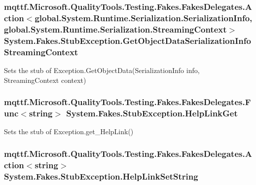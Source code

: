 \hypertarget{class_system_1_1_fakes_1_1_stub_exception_a9a4c74afd3db761e13b159f7393c77fe}{
\subsubsection[{Get\-Object\-Data\-Serialization\-Info\-Streaming\-Context}]{\setlength{\rightskip}{0pt plus 5cm}mqttf.\-Microsoft.\-Quality\-Tools.\-Testing.\-Fakes.\-Fakes\-Delegates.\-Action$<$global.\-System.\-Runtime.\-Serialization.\-Serialization\-Info, global.\-System.\-Runtime.\-Serialization.\-Streaming\-Context$>$ System.\-Fakes.\-Stub\-Exception.\-Get\-Object\-Data\-Serialization\-Info\-Streaming\-Context}}\label{class_system_1_1_fakes_1_1_stub_exception_a9a4c74afd3db761e13b159f7393c77fe}


Sets the stub of Exception.\-Get\-Object\-Data(\-Serialization\-Info info, Streaming\-Context context)

\hypertarget{class_system_1_1_fakes_1_1_stub_exception_a2a67e8ae5a10d751b04148d7aac20814}{
\subsubsection[{Help\-Link\-Get}]{\setlength{\rightskip}{0pt plus 5cm}mqttf.\-Microsoft.\-Quality\-Tools.\-Testing.\-Fakes.\-Fakes\-Delegates.\-Func$<$string$>$ System.\-Fakes.\-Stub\-Exception.\-Help\-Link\-Get}}\label{class_system_1_1_fakes_1_1_stub_exception_a2a67e8ae5a10d751b04148d7aac20814}


Sets the stub of Exception.\-get\-\_\-\-Help\-Link()

\hypertarget{class_system_1_1_fakes_1_1_stub_exception_a77ad147ccd9c4882af397ffc6f92a9fc}{
\subsubsection[{Help\-Link\-Set\-String}]{\setlength{\rightskip}{0pt plus 5cm}mqttf.\-Microsoft.\-Quality\-Tools.\-Testing.\-Fakes.\-Fakes\-Delegates.\-Action$<$string$>$ System.\-Fakes.\-Stub\-Exception.\-Help\-Link\-Set\-String}}\label{class_system_1_1_fakes_1_1_stub_exception_a77ad147ccd9c4882af397ffc6f92a9fc}



